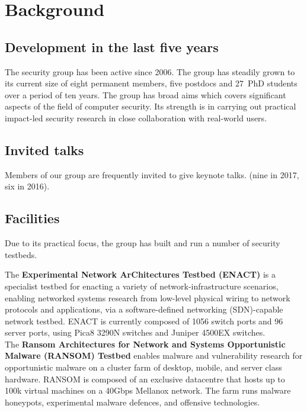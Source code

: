 \documentclass[11pt]{article}
\def\numphdstudents{27}
\begin{document}
    \section{Background}

    \subsection{Development in the last five years}
    The security group has been active since 2006. The group has
    steadily grown to its current size of eight permanent members,
    five postdocs and \numphdstudents \ PhD students over a period of
    ten years. The group has broad aims which  covers
    significant aspects of the field of computer security.  Its
    strength is in carrying out practical impact-led security research
    in close collaboration with real-world users.
        
    \subsection{Invited talks}
    Members of our group are frequently invited to give keynote talks.
    (nine in 2017, six in 2016). 
    
    \subsection{Facilities}
    Due to its practical focus, the group has built and run a number
    of security testbeds.

    The {\bf Experimental Network ArChitectures Testbed (ENACT)}
    is a specialist testbed for enacting a variety of
    network-infrastructure scenarios, enabling networked systems
    research from low-level physical wiring to network protocols and
    applications, via a software-defined networking (SDN)-capable
    network testbed. ENACT is currently composed of 1056 switch ports
    and 96 server ports, using Pica8 3290N switches and Juniper 4500EX
    switches.\\

    The {\bf Ransom Architectures for Network and Systems
      Opportunistic Malware (RANSOM) Testbed} enables malware and
    vulnerability research for opportunistic malware on a cluster farm
    of desktop, mobile, and server class hardware. RANSOM is composed
    of an exclusive datacentre that hosts up to 100k virtual machines
    on a 40Gbps Mellanox network. The farm runs malware honeypots,
    experimental malware defences, and offensive technologies.\\
    
\end{document}
